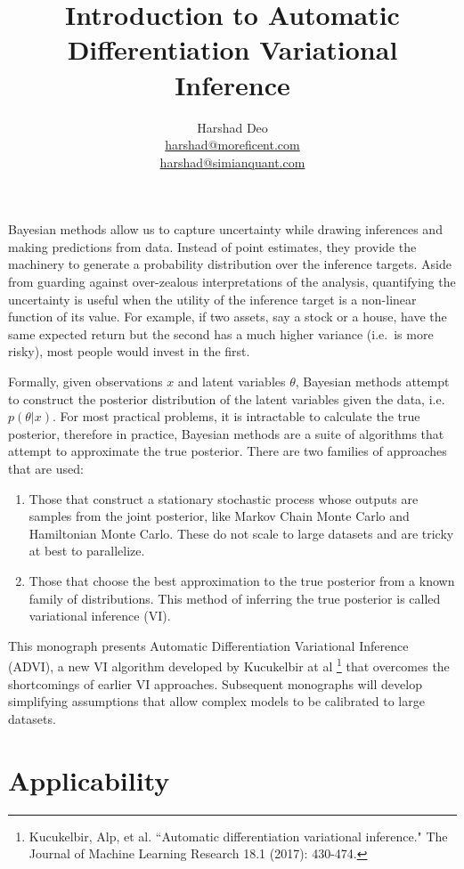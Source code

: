 \documentclass[10pt]{article}
\title{Introduction to Automatic Differentiation Variational Inference}
\author{Harshad Deo \\ 
  \href{mailto:harshad@moreficent.com}{harshad@moreficent.com} \\ 
  \href{mailto:harshad@simianquant.com}{harshad@simianquant.com}
}
\date{}
\begin{document}
  
\maketitle

Bayesian methods allow us to capture uncertainty while drawing inferences and making predictions from data. Instead of 
point estimates, they provide the machinery to generate a probability distribution over the inference targets. Aside from 
guarding against over-zealous interpretations of the analysis, quantifying the uncertainty is useful when the utility of 
the inference target is a non-linear function of its value. For example, if two assets, say a stock or a house, have the
same expected return but the second has a much higher variance (i.e.\ is more risky), most people would invest in the 
first. 

Formally, given observations $x$ and latent variables $\theta$, Bayesian methods attempt to construct the posterior 
distribution of the latent variables given the data, i.e.\ $p(\theta|x)$. For most practical problems, it is intractable 
to calculate the true posterior, therefore in practice, Bayesian methods are a suite of algorithms that attempt to 
approximate the true posterior. There are two families of approaches that are used:

\begin{enumerate}
  \item Those that construct a stationary stochastic process whose outputs are samples from the joint posterior, like 
    Markov Chain Monte Carlo and Hamiltonian Monte Carlo. These do not scale to large datasets and are tricky at 
    best to parallelize.
  \item Those that choose the best approximation to the true posterior from a known family of distributions. This method 
    of inferring the true posterior is called variational inference (VI).
\end{enumerate}

This monograph presents Automatic Differentiation Variational Inference (ADVI), a new VI algorithm
developed by Kucukelbir at al \footnote{Kucukelbir, Alp, et al. ``Automatic differentiation variational inference." 
The Journal of Machine Learning Research 18.1 (2017): 430-474.} that overcomes the shortcomings of earlier VI approaches.
Subsequent monographs will develop simplifying assumptions that allow complex models to be calibrated to large datasets. 

\section*{Applicability}
\end{document}
